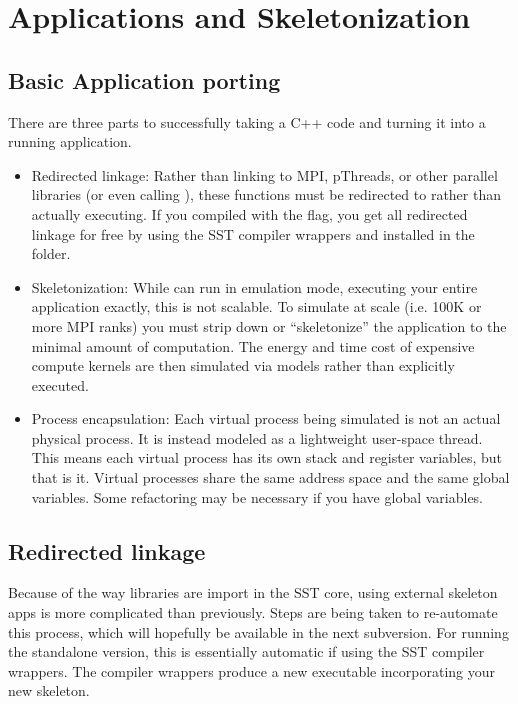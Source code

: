 
\chapter{Applications and Skeletonization}
\label{sec:skeletonization}

\section{Basic Application porting}
\label{sec:skel:basic}
There are three parts to successfully taking a C++ code and turning it into a running application.
\begin{itemize}
\item Redirected linkage: Rather than linking to MPI, pThreads, or other parallel libraries (or even calling ), these functions must be redirected to \sstmacro rather than actually executing.
If you compiled with the  flag, you get all redirected linkage for free by using
the SST compiler wrappers  and  installed in the  folder.
\item Skeletonization: While \sstmacro can run in emulation mode, executing your entire application exactly, this is not scalable.  To simulate at scale (i.e. 100K or more MPI ranks) you must strip down or ``skeletonize'' the application to the minimal amount of computation.  The energy and time cost of expensive compute kernels are then simulated via models rather than explicitly executed. 

\item Process encapsulation: Each virtual process being simulated is not an actual physical process. It is instead modeled as a lightweight user-space thread.  This means each virtual process has its own stack and register variables, but that is it.
Virtual processes share the same address space and the same global variables.  Some refactoring may be necessary if you have global variables.

\end{itemize}

\section{Redirected linkage}
\label{sec:skel:linkage}
Because of the way libraries are import in the SST core, using external skeleton apps is more complicated than previously.  Steps are being taken to re-automate this process, which will hopefully be available in the next subversion. For running the standalone version, this is essentially automatic  if using the SST compiler wrappers.  The compiler wrappers produce a new executable incorporating your new skeleton.

